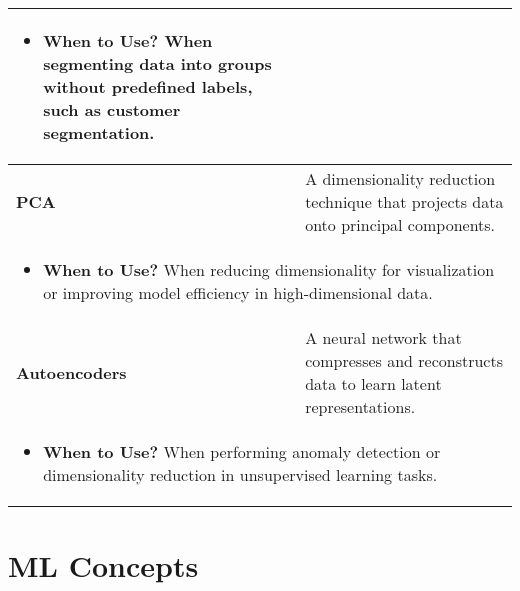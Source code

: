 \documentclass{article}
\begin{document}
\begin{summary}
\begin{center}
\begin{tabular}{ll}
{        \begin{itemize}
            \item \textbf{When to Use?} When segmenting data into groups without predefined labels, such as customer segmentation.
        \end{itemize}} \\
        \midrule
        \textbf{PCA} & A dimensionality reduction technique that projects data onto principal components. \\
        \multicolumn{2}{p{\linewidth}}{
        \begin{itemize}
            \item \textbf{When to Use?} When reducing dimensionality for visualization or improving model efficiency in high-dimensional data.
        \end{itemize}} \\
        \midrule
        \textbf{Autoencoders} & A neural network that compresses and reconstructs data to learn latent representations. \\
        \multicolumn{2}{p{\linewidth}}{
        \begin{itemize}
            \item \textbf{When to Use?} When performing anomaly detection or dimensionality reduction in unsupervised learning tasks.
        \end{itemize}} \\
        \bottomrule
        \end{tabular}
    \end{center}
\end{summary}
\newpage


\section{ML Concepts}
\end{document}
